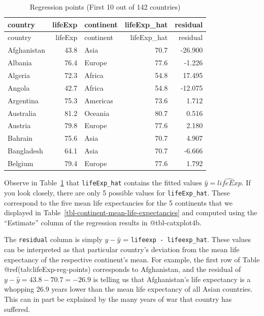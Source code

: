 \documentclass[
  letterpaper,
  DIV=11,
  numbers=noendperiod]{scrreprt}
\theoremstyle{definition}
\theoremstyle{remark}
\begin{document}
\hypertarget{tbl-lifeExp-reg-points}{}
\begin{longtable}[]{@{}lrlrr@{}}
\caption{\label{tbl-lifeExp-reg-points}Regression points (First 10 out
of 142 countries)}\tabularnewline
\toprule\noalign{}
country & lifeExp & continent & lifeExp\_hat & residual \\
\midrule\noalign{}
\endfirsthead
\toprule\noalign{}
country & lifeExp & continent & lifeExp\_hat & residual \\
\midrule\noalign{}
\endhead
\bottomrule\noalign{}
\endlastfoot
Afghanistan & 43.8 & Asia & 70.7 & -26.900 \\
Albania & 76.4 & Europe & 77.6 & -1.226 \\
Algeria & 72.3 & Africa & 54.8 & 17.495 \\
Angola & 42.7 & Africa & 54.8 & -12.075 \\
Argentina & 75.3 & Americas & 73.6 & 1.712 \\
Australia & 81.2 & Oceania & 80.7 & 0.516 \\
Austria & 79.8 & Europe & 77.6 & 2.180 \\
Bahrain & 75.6 & Asia & 70.7 & 4.907 \\
Bangladesh & 64.1 & Asia & 70.7 & -6.666 \\
Belgium & 79.4 & Europe & 77.6 & 1.792 \\
\end{longtable}

Observe in Table~\ref{tbl-lifeExp-reg-points} that \texttt{lifeExp\_hat}
contains the fitted values \(\hat{y} = \widehat{lifeExp}\). If you look
closely, there are only 5 possible values for \texttt{lifeExp\_hat}.
These correspond to the five mean life expectancies for the 5 continents
that we displayed in Table~\ref{tbl-continent-mean-life-expectancies}
and computed using the ``Estimate'' column of the regression results in
@tbl-catxplot4b.

The \texttt{residual} column is simply \(y - \widehat{y}\) =
\texttt{lifeexp\ -\ lifeexp\_hat}. These values can be interpreted as
that particular country's deviation from the mean life expectancy of the
respective continent's mean. For example, the first row of Table
@ref(tab:lifeExp-reg-points) corresponds to Afghanistan, and the
residual of \(y - \widehat{y} = 43.8 - 70.7 = -26.9\) is telling us that
Afghanistan's life expectancy is a whopping 26.9 years lower than the
mean life expectancy of all Asian countries. This can in part be
explained by the many years of war that country has suffered.
\end{document}
